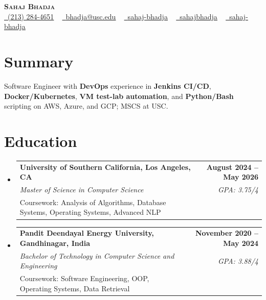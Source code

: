 \documentclass[letterpaper,10pt]{article}
\makeatletter
\newcommand{\resumeEduSubheading}[5]{\vspace{-1pt}\item\begin{tabular*}{1.0\textwidth}[t]{l@{\extracolsep{\fill}}r}\textbf{#1} & \textbf{\small #2} \\\textit{\small #3} & \textit{\small #4} \\\small #5 & \\\end{tabular*}\vspace{-4pt}}
\newcommand{\resumeSubHeadingListStart}{\begin{itemize}[leftmargin=0.0in, label={}]}
\newcommand{\resumeSubHeadingListEnd}{\end{itemize}}
\makeatother
\begin{document}
\begin{center}
{\Huge \scshape \textbf{Sahaj Bhadja}} \\ \vspace{1pt}
\small \href{tel:(213) 284-4651}{\faPhone\ \underline{(213) 284-4651}} ~ \href{mailto: bhadja@usc.edu}{\raisebox{-0.2\height}\faEnvelope\ \underline{bhadja@usc.edu}} ~
\href{https://www.linkedin.com/in/sahaj-bhadja/}{\raisebox{-0.2\height}\faLinkedin\ \underline{sahaj-bhadja}} ~ \href{https://github.com/SAHAJ-BHADJA}{\raisebox{-0.2\height}\faGithub\ \underline{sahajbhadja}} ~
\href{https://sahaj-bhadja.vercel.app/}{\raisebox{-0.2\height}\faGlobe\ \underline{sahaj-bhadja}}
\end{center}
\vspace{-16pt}
\section{Summary}
\begin{itemize}[leftmargin=0.15in, label={}]
\small{\item{Software Engineer with \textbf{DevOps} experience in \textbf{Jenkins CI/CD}, \textbf{Docker/Kubernetes}, \textbf{VM test-lab automation}, and \textbf{Python/Bash} scripting on AWS, Azure, and GCP; MSCS at USC.}}
\end{itemize}
\vspace{-6pt}
\section{Education}
\resumeSubHeadingListStart
\resumeEduSubheading{University of Southern California, Los Angeles, CA}{August 2024 -- May 2026}{Master of Science in Computer Science}{GPA: 3.75/4}{Coursework: Analysis of Algorithms, Database Systems, Operating Systems, Advanced NLP}
\vspace{-9pt}
\resumeEduSubheading{Pandit Deendayal Energy University, Gandhinagar, India}{November 2020 -- May 2024}{Bachelor of Technology in Computer Science and Engineering}{GPA: 3.88/4}{Coursework: Software Engineering, OOP, Operating Systems, Data Retrieval}
\resumeSubHeadingListEnd
\vspace{-6pt}
\end{document}

